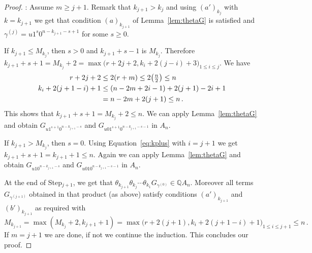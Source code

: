 \documentclass[11pt]{amsart}
\theoremstyle{definition}
\numberwithin{equation}{section}
\begin{document}
\begin{proof}
\medskip
{}: Assume $m\ge j+1$. Remark that $k_{j+1}>k_j$ and using $(a')_{k_{j}}$ with $k=k_{j+1}$ we get that condition $(a)_{k_{j+1}}$ of Lemma~\ref{lem:thetaG} is satisfied and $\gamma^{(j)} = u1^{s}0^{n-k_{j+1}-s+1}$ { for some } $s\ge 0$.

If $k_{j+1}\le M_{k_j}$, then $s>0$ and $k_{j+1}+s-1$ is $M_{k_j}$. Therefore $k_{j+1}+s+1=M_{k_j}+2=\max\big(r+2j+2,k_i+2(j-i)+3\big)_{1\le i\le j}$. We have
\begin{align}
 r+2j+2&\le  2(r+m)\le 2\big({\textstyle \frac{n}{2}}\big)\le n \label{eq:rplus}\\
 k_i+2(j+1-i)+1&\le (n-2m+2i-1)+2(j+1)-2i+1 \label{eq:kplus}\\
&=n-2m+2(j+1)\le n\,. \notag
 \end{align}
 This shows that $k_{j+1}+s+1=M_{k_j}+2\le n$.
We can apply Lemma~\ref{lem:thetaG} and obtain $G_{u1^{s+1}0^{n-k_{j+1}-s}}$ and $G_{u01^{s+1}0^{n-k_{j+1}-s-1}}$ in $A_n$.

If $k_{j+1}> M_{k_j}$, then $s=0$. Using Equation~\ref{eq:kplus} with $i=j+1$ we get $k_{j+1}+s+1=k_{j+1}+1\le n$.
Again we can apply Lemma~\ref{lem:thetaG} and obtain $G_{u10^{n-k_{j+1}-s}}$ and $G_{u010^{n-k_{j+1}-s-1}}$ in $A_n$.

At the end of Step$_{j+1}$, we get that $\theta_{k_{j+1}}\theta_{k_{j}}\cdots\theta_{k_1}G_{\gamma^{(0)}}\in {\mathbb Q} A_n$. Moreover all terms $G_{\gamma^{(j+1)}}$ obtained in that product (as above) satisfy conditions $(a')_{k_{j+1}}$ and $(b')_{k_{j+1}}$  as required with
 $$M_{k_{j+1}}=\max(M_{k_j}+2,k_{j+1}+1) = \max\big(r+2(j+1),k_i+2(j+1-i)+1\big)_{1\le i\le j+1}\le n\,.$$
If $m=j+1$ we are done, if not we continue the induction.
This concludes our proof.
\end{proof}

\vskip 1in
\end{document}
